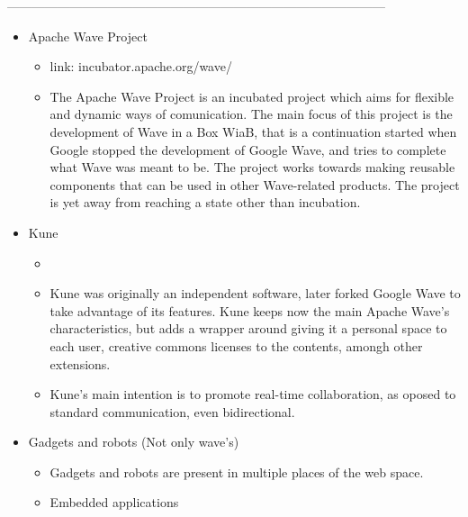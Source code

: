 \begin{center}
------------------------------------------------------------------------------------------\\
\end{center}



\begin{itemize}
  \item Apache Wave Project
  \begin{itemize}
    \item link: incubator.apache.org/wave/
    \item The Apache Wave Project is an incubated project which aims for flexible and dynamic ways of comunication. The main focus of this project is the development of Wave in a Box WiaB, that is a continuation started when Google stopped the development of Google Wave, and tries to complete what Wave was meant to be. The project works towards making reusable components that can be used in other Wave-related products. The project is yet away from reaching a state other than incubation.
  \end{itemize}
  \item Kune
  \begin{itemize}
    \item {}
    \item Kune was originally an independent software, later forked Google Wave to take advantage of its features. Kune keeps now the main Apache Wave's characteristics, but adds a wrapper around giving it a personal space to each user, creative commons licenses to the contents, amongh other extensions.
    \item Kune's main intention is to promote real-time collaboration, as oposed to standard communication, even bidirectional.
  \end{itemize}
  \item Gadgets and robots (Not only wave's)
    \begin{itemize}
      \item Gadgets and robots are present in multiple places of the web space.
      \item Embedded applications

\end{itemize}
\end{itemize}
